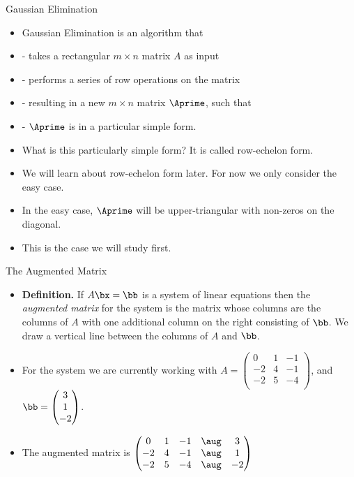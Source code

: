 \documentclass{beamer}
\begin{document}
\begin{frame}{Gaussian Elimination}

\begin{itemize}
\item Gaussian Elimination is an algorithm that
\item - takes a rectangular $m\times n$ matrix $A$ as input
\item - performs a series of row operations on the matrix
\item - resulting in a new $m\times n$ matrix $\Aprime$, such that
\item - $\Aprime$ is in a particular simple form.
\item What is this particularly simple form? It is called row-echelon form.
\item We will learn about row-echelon form later. For now we only consider the easy case.
\item In the easy case, $\Aprime$ will be upper-triangular with non-zeros on the diagonal.
\item This is the case we will study first.
\end{itemize}
\end{frame}
\begin{frame}{The Augmented Matrix}

\begin{itemize}
\item \textbf{Definition.} If $A\bx=\bb$ is a system of linear equations then the
\emph{augmented matrix} for the system is the matrix whose columns are the columns
of $A$ with one additional column on the right consisting of $\bb$. We draw
a vertical line between the columns of $A$ and $\bb$.
\item For the system we are currently working with
$A=
\begin{pmatrix}
 0 & 1 & -1 \\
-2 & 4 & -1 \\
-2 & 5 & -4 \\
\end{pmatrix}
$,
and
$
\bb =
\begin{pmatrix}
3 \\ 1 \\ -2
\end{pmatrix}
$.
\item The augmented matrix is
$
\begin{pmatrix}
 0 & 1 & -1  &  \aug & 3  \\
-2 & 4 & -1  &  \aug & 1  \\
-2 & 5 & -4  &  \aug & -2  \\
\end{pmatrix}
$
\end{itemize}
\end{frame}
\end{document}
